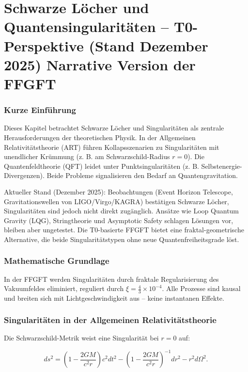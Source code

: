 \chapter{Schwarze Löcher und Quantensingularitäten – T0-Perspektive (Stand Dezember 2025)  Narrative Version der FFGFT}


	
	\subsection*{Kurze Einführung}
	
	Dieses Kapitel betrachtet Schwarze Löcher und Singularitäten als zentrale Herausforderungen der theoretischen Physik. In der Allgemeinen Relativitätstheorie (ART) führen Kollapsszenarien zu Singularitäten mit unendlicher Krümmung (z. B. am Schwarzschild-Radius \(r=0\)). Die Quantenfeldtheorie (QFT) leidet unter Punktsingularitäten (z. B. Selbstenergie-Divergenzen). Beide Probleme signalisieren den Bedarf an Quantengravitation.
	
	Aktueller Stand (Dezember 2025): Beobachtungen (Event Horizon Telescope, Gravitationswellen von LIGO/Virgo/KAGRA) bestätigen Schwarze Löcher, Singularitäten sind jedoch nicht direkt zugänglich. Ansätze wie Loop Quantum Gravity (LQG), Stringtheorie und Asymptotic Safety schlagen Lösungen vor, bleiben aber ungetestet. Die T0-basierte FFGFT bietet eine fraktal-geometrische Alternative, die beide Singularitätstypen ohne neue Quantenfreiheitsgrade löst.
	
	\subsection*{Mathematische Grundlage}
	
	In der FFGFT werden Singularitäten durch fraktale Regularisierung des Vakuumfeldes eliminiert, reguliert durch \(\xi = \frac{4}{3} \times 10^{-4}\). Alle Prozesse sind kausal und breiten sich mit Lichtgeschwindigkeit aus – keine instantanen Effekte.
	
	\subsection*{Singularitäten in der Allgemeinen Relativitätstheorie}
	
	Die Schwarzschild-Metrik weist eine Singularität bei \(r=0\) auf:
	
	\begin{equation}
		ds^2 = \left(1 - \frac{2GM}{c^2 r}\right) c^2 dt^2 - \left(1 - \frac{2GM}{c^2 r}\right)^{-1} dr^2 - r^2 d\Omega^2.
	\end{equation}
	
